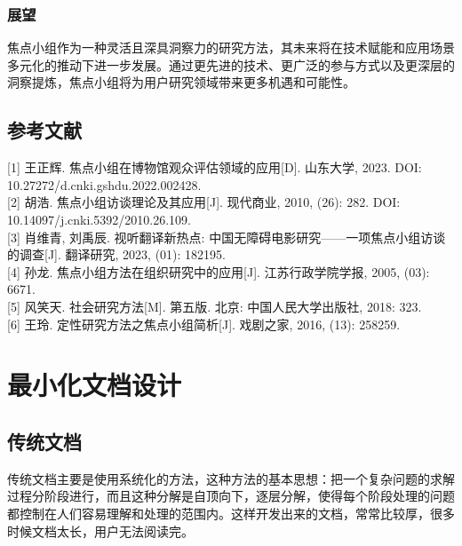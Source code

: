 \documentclass[letterpaper,10pt,english]{sphinxmanual}
\begin{document}
\subsection{展望}
\label{\detokenize{user-research/focus-group:id47}}
\sphinxAtStartPar
焦点小组作为一种灵活且深具洞察力的研究方法，其未来将在技术赋能和应用场景多元化的推动下进一步发展。通过更先进的技术、更广泛的参与方式以及更深层的洞察提炼，焦点小组将为用户研究领域带来更多机遇和可能性。


\section{参考文献}
\label{\detokenize{user-research/focus-group:id48}}
\sphinxAtStartPar
{[}1{]} 王正辉. 焦点小组在博物馆观众评估领域的应用{[}D{]}. 山东大学, 2023. DOI: 10.27272/d.cnki.gshdu.2022.002428.\\
{[}2{]} 胡浩. 焦点小组访谈理论及其应用{[}J{]}. 现代商业, 2010, (26): 282. DOI: 10.14097/j.cnki.5392/2010.26.109.\\
{[}3{]} 肖维青, 刘禹辰. 视听翻译新热点: 中国无障碍电影研究——一项焦点小组访谈的调查{[}J{]}. 翻译研究, 2023, (01): 182\sphinxhyphen{}195.\\
{[}4{]} 孙龙. 焦点小组方法在组织研究中的应用{[}J{]}. 江苏行政学院学报, 2005, (03): 66\sphinxhyphen{}71.\\
{[}5{]} 风笑天. 社会研究方法{[}M{]}. 第五版. 北京: 中国人民大学出版社, 2018: 323.\\
{[}6{]} 王玲. 定性研究方法之焦点小组简析{[}J{]}. 戏剧之家, 2016, (13): 258\sphinxhyphen{}259.

\sphinxstepscope


\chapter{最小化文档设计}
\label{\detokenize{design/minimalism:id1}}\label{\detokenize{design/minimalism::doc}}

\section{传统文档}
\label{\detokenize{design/minimalism:id2}}
\sphinxAtStartPar
传统文档主要是使用系统化的方法，这种方法的基本思想：把一个复杂问题的求解过程分阶段进行，而且这种分解是自顶向下，逐层分解，使得每个阶段处理的问题都控制在人们容易理解和处理的范围内。这样开发出来的文档，常常比较厚，很多时候文档太长，用户无法阅读完。
\end{document}
